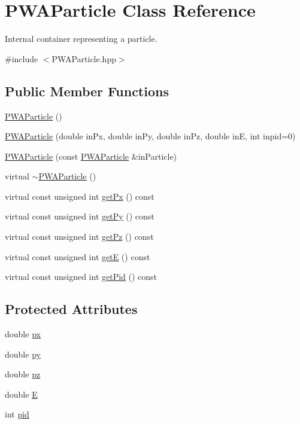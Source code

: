 \hypertarget{classPWAParticle}{
\section{PWAParticle Class Reference}
\label{d9/dcb/classPWAParticle}
}


Internal container representing a particle.  




{\ttfamily \#include $<$PWAParticle.hpp$>$}

\subsection*{Public Member Functions}
\begin{DoxyCompactItemize}
\item 
\hyperlink{classPWAParticle_ad2757e82d6f72eb190f2a5530f5873d3}{PWAParticle} ()
\item 
\hyperlink{classPWAParticle_a05dccc6d5ab7b646a08970cd170afcd5}{PWAParticle} (double inPx, double inPy, double inPz, double inE, int inpid=0)
\item 
\hyperlink{classPWAParticle_a0d440b263ef67cbfca30cbed4c8d3bb0}{PWAParticle} (const \hyperlink{classPWAParticle}{PWAParticle} \&inParticle)
\item 
virtual \hyperlink{classPWAParticle_af90e6b356ab1069a0f3aa09b6b1be95e}{$\sim$PWAParticle} ()
\item 
virtual const unsigned int \hyperlink{classPWAParticle_a129657df176f87f4b440c9da64b4f043}{getPx} () const 
\item 
virtual const unsigned int \hyperlink{classPWAParticle_a4db6682798c5d2a8a02d2c5798376da6}{getPy} () const 
\item 
virtual const unsigned int \hyperlink{classPWAParticle_aa9a08d98d4055daf048aae8c97ba64a0}{getPz} () const 
\item 
virtual const unsigned int \hyperlink{classPWAParticle_ae6682af4c3463bd5b8f3228a723fd81e}{getE} () const 
\item 
virtual const unsigned int \hyperlink{classPWAParticle_a7697a76e6b79dad28e557f4d9b7840e1}{getPid} () const 
\end{DoxyCompactItemize}
\subsection*{Protected Attributes}
\begin{DoxyCompactItemize}
\item 
double \hyperlink{classPWAParticle_a785b498941ebc062698dbd34be8c6d96}{px}
\item 
double \hyperlink{classPWAParticle_a51a443171d65b2abd885c51f92068f85}{py}
\item 
double \hyperlink{classPWAParticle_aaf5605fd8e557449072e9437add86a15}{pz}
\item 
double \hyperlink{classPWAParticle_ae1b3e03ff18925509275e763e3a76417}{E}
\item 
int \hyperlink{classPWAParticle_af45a7569c8ddbf0b8971cbbc24ab879d}{pid}
\end{DoxyCompactItemize}


